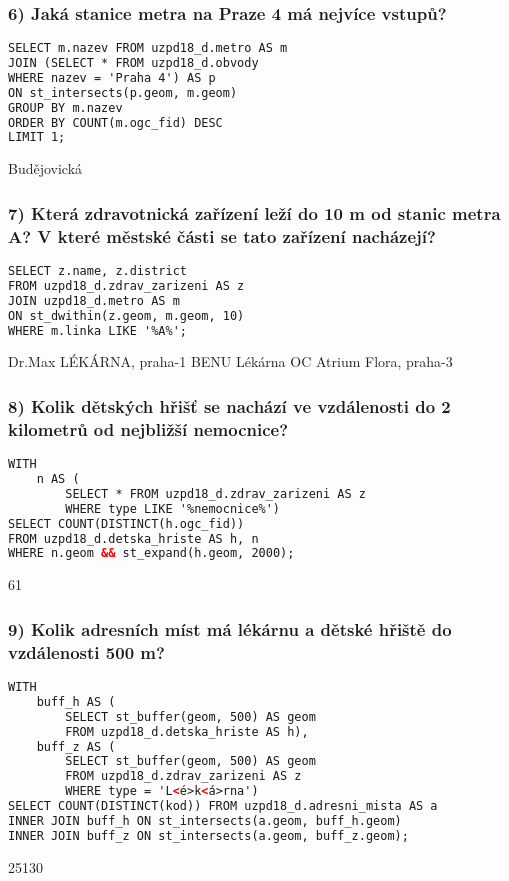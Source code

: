 \documentclass[a4paper, 12pt]{article}
\begin{document}
\subsubsection*{6) Jaká stanice metra na Praze 4 má nejvíce vstupů?}
\begin{lstlisting}[language=html]
SELECT m.nazev FROM uzpd18_d.metro AS m
JOIN (SELECT * FROM uzpd18_d.obvody 
WHERE nazev = 'Praha 4') AS p
ON st_intersects(p.geom, m.geom)
GROUP BY m.nazev
ORDER BY COUNT(m.ogc_fid) DESC
LIMIT 1;
\end{lstlisting}
Budějovická
\vspace{0.8cm}

\subsubsection*{7) Která zdravotnická zařízení leží do 10 m od stanic metra A? V které městské části se tato zařízení nacházejí?}
\begin{lstlisting}[language=html]
SELECT z.name, z.district 
FROM uzpd18_d.zdrav_zarizeni AS z
JOIN uzpd18_d.metro AS m
ON st_dwithin(z.geom, m.geom, 10)
WHERE m.linka LIKE '%A%';
\end{lstlisting}
\begin{flushleft}
Dr.Max LÉKÁRNA, praha-1\linebreak
BENU Lékárna OC Atrium Flora, praha-3
\end{flushleft}
\vspace{0.009cm}

\subsubsection*{8) Kolik dětských hřišť se nachází ve vzdálenosti do 2 kilometrů od nejbližší nemocnice?}
\begin{lstlisting}[language=html]
WITH 
    n AS (
        SELECT * FROM uzpd18_d.zdrav_zarizeni AS z 
        WHERE type LIKE '%nemocnice%')
SELECT COUNT(DISTINCT(h.ogc_fid)) 
FROM uzpd18_d.detska_hriste AS h, n
WHERE n.geom && st_expand(h.geom, 2000);
\end{lstlisting}
61
\vspace{0.8cm}

\subsubsection*{9) Kolik adresních míst má lékárnu a dětské hřiště do vzdálenosti 500 m?}
\begin{lstlisting}[language=html]
WITH
    buff_h AS (
        SELECT st_buffer(geom, 500) AS geom 
        FROM uzpd18_d.detska_hriste AS h),
    buff_z AS (
        SELECT st_buffer(geom, 500) AS geom 
        FROM uzpd18_d.zdrav_zarizeni AS z
        WHERE type = 'L<é>k<á>rna') 
SELECT COUNT(DISTINCT(kod)) FROM uzpd18_d.adresni_mista AS a
INNER JOIN buff_h ON st_intersects(a.geom, buff_h.geom)
INNER JOIN buff_z ON st_intersects(a.geom, buff_z.geom);
\end{lstlisting}
25130
\vspace{0.8cm}
\end{document}
